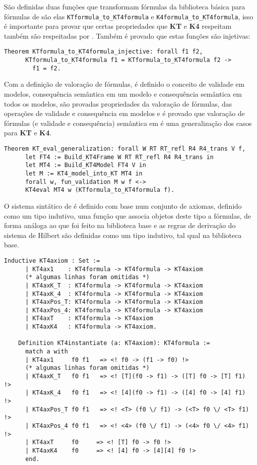       São definidas duas funções que transformam fórmulas da biblioteca básica para fórmulas de \SisT são elas \texttt{KTformula\_to\_KT4formula} e \texttt{K4formula\_to\_KT4formula},
      isso é importante para provar que certas propriedades que \textbf{KT} e \textbf{K4} respeitam também são respeitadas por \SisT. Também é provado que estas funções são injetivas:
      \begin{lstlisting}[language=coq]
    Theorem KTformula_to_KT4formula_injective: forall f1 f2,
      KTformula_to_KT4formula f1 = KTformula_to_KT4formula f2 ->
        f1 = f2.
      \end{lstlisting}

      Com a definição de valoração de fórmulas, é definido o conceito de validade em modelos, consequência semântica em um modelo e consequência semântica em todos os modelos,
      são provadas propriedades da valoração de fórmulas, das operações de validade e consequência em modelos e é provado que valoração de fórmulas (e validade e consequência)
      semântica em \SisT é uma generalização dos casos para \textbf{KT} e \textbf{K4}.
      \begin{lstlisting}[language=coq]
    Theorem KT_eval_generalization: forall W RT RT_refl R4 R4_trans V f,
      let FT4 := Build_KT4Frame W RT RT_refl R4 R4_trans in
      let MT4 := Build_KT4Model FT4 V in
      let M := KT4_model_into_KT MT4 in
      forall w, fun_validation M w f <->
      KT4eval MT4 w (KTformula_to_KT4formula f).
      \end{lstlisting}

      O sistema sintático de \SisT é definido com base num conjunto de axiomas, definido como um tipo indutivo, uma função que associa objetos deste tipo a fórmulas, de forma
      análoga ao que foi feito na biblioteca base e as regras de derivação do sistema de Hilbert são definidas como um tipo indutivo, tal qual na biblioteca base.
      \begin{lstlisting}[language=coq]
    Inductive KT4axiom : Set :=
      | KT4ax1    : KT4formula -> KT4formula -> KT4axiom
      (* algumas linhas foram omitidas *)
      | KT4axK_T  : KT4formula -> KT4formula -> KT4axiom
      | KT4axK_4  : KT4formula -> KT4formula -> KT4axiom
      | KT4axPos_T: KT4formula -> KT4formula -> KT4axiom
      | KT4axPos_4: KT4formula -> KT4formula -> KT4axiom
      | KT4axT    : KT4formula -> KT4axiom
      | KT4axK4   : KT4formula -> KT4axiom.

    Definition KT4instantiate (a: KT4axiom): KT4formula :=
      match a with
      | KT4ax1     f0 f1   => <! f0 -> (f1 -> f0) !>
      (* algumas linhas foram omitidas *)
      | KT4axK_T   f0 f1   => <! [T](f0 -> f1) -> ([T] f0 -> [T] f1) !>
      | KT4axK_4   f0 f1   => <! [4](f0 -> f1) -> ([4] f0 -> [4] f1) !>
      | KT4axPos_T f0 f1   => <! <T> (f0 \/ f1) -> (<T> f0 \/ <T> f1) !>
      | KT4axPos_4 f0 f1   => <! <4> (f0 \/ f1) -> (<4> f0 \/ <4> f1) !>
      | KT4axT     f0     => <! [T] f0 -> f0 !>
      | KT4axK4    f0     => <! [4] f0 -> [4][4] f0 !>
      end.
      \end{lstlisting}

